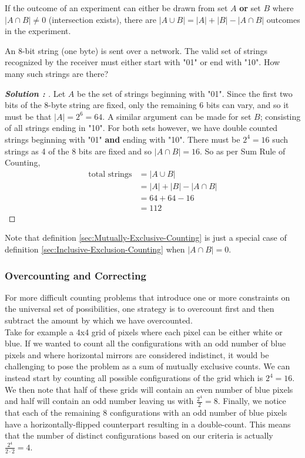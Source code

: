 \documentclass[11pt]{article}
\newenvironment{solution}[1][]{%
  \renewcommand\qedsymbol{$\blacksquare$}%
  \def\temp{\normalfont\bfseries Solution \theexample: #1}
  \begin{proof}[\temp]
  \normalfont %
}{%
  \end{proof}
}
\newcommand{\BF}{\textbf}
\begin{document}
\begin{definition}
    \label{sec:Inclusive-Exclusion-Counting}
    If the outcome of an experiment can either be drawn from set $A$ \BF{or} set $B$ where $|A\cap B| \neq 0$ (intersection exists), there
    are $|A \cup B| = |A| + |B| - |A \cap B|$ outcomes in the experiment.
\end{definition}
\begin{example}
    An 8-bit string (one byte) is sent over a network. The valid set of strings recognized by the receiver must either start with "01" or
    end with "10". How many such strings are there?
\end{example}
\begin{solution}
    Let $A$ be the set of strings beginning with "01". Since the first two bits of the 8-byte string are fixed, only the remaining 6 bits
    can vary, and so it must be that $|A|=2^{6}=64$. A similar argument can be made for set $B$; consisting of all strings ending in "10".
    For both sets however, we have double counted strings beginning with "01" \BF{and} ending with "10". There must be $2^{4} = 16$ such
    strings as 4 of the 8 bits are fixed and so $|A \cap B| = 16$. So as per Sum Rule of Counting,
    \begin{align*}
        \text{total strings} &= |A \cup B|\\
                             &= |A|+|B| - |A \cap B|\\
                             &= 64 + 64 - 16\\
                             &= 112
    \end{align*} 
\end{solution}
Note that definition \ref{sec:Mutually-Exclusive-Counting} is just a special case of definition \ref{sec:Inclusive-Exclusion-Counting} when
$|A \cap B| = 0$.

\subsubsection*{Overcounting and Correcting}
For more difficult counting problems that introduce one or more constraints on the universal set of possibilities, one strategy is to
overcount first and then subtract the amount by which we have overcounted.\\

Take for example a 4x4 grid of pixels where each pixel can be either white or blue. If we wanted to count all the configurations with an
odd number of blue pixels and where horizontal mirrors are considered indistinct, it would be challenging to pose the problem as a sum of
mutually exclusive counts. We can instead start by counting all possible configurations of the grid which is $2^{4} = 16$. We then note that
half of these grids will contain an even number of blue pixels and half will contain an odd number leaving us with $\frac{2^{4}}{2} = 8$. Finally,
we notice that each of the remaining 8 configurations with an odd number of blue pixels have a horizontally-flipped counterpart resulting in a double-count.
This means that the number of distinct configurations based on our criteria is actually $\frac{2^{4}}{2 \cdot 2} = 4$.
\newpage
\end{document}
